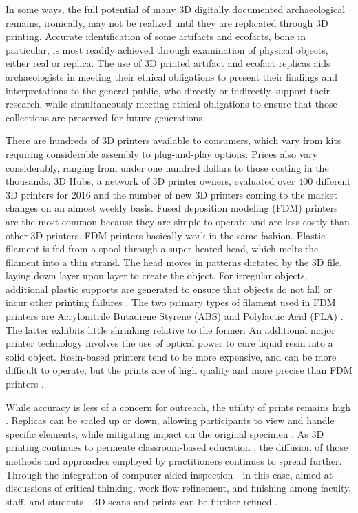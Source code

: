 \documentclass[review]{elsarticle}
\begin{document}
In some ways, the full potential of many 3D digitally documented archaeological remains, ironically, may not be realized until they are replicated through 3D printing. Accurate identification of some artifacts and ecofacts, bone in particular, is most readily achieved through examination of physical objects, either real or replica. The use of 3D printed artifact and ecofact replicas aids archaeologists in meeting their ethical obligations to present their findings and interpretations to the general public, who directly or indirectly support their research, while simultaneously meeting ethical obligations to ensure that those collections are preserved for future generations \citep{RN725}.

There are hundreds of 3D printers available to consumers, which vary from kits requiring considerable assembly to plug-and-play options. Prices also vary considerably, ranging from under one hundred dollars to those costing in the thousands. 3D Hubs, a network of 3D printer owners, evaluated over 400 different 3D printers for 2016 \citep{RN11513} and the number of new 3D printers coming to the market changes on an almost weekly basis. Fused deposition modeling (FDM) printers are the most common because they are simple to operate and are less costly than other 3D printers. FDM printers basically work in the same fashion. Plastic filament is fed from a spool through a super-heated head, which melts the filament into a thin strand. The head moves in patterns dictated by the 3D file, laying down layer upon layer to create the object. For irregular objects, additional plastic supports are generated to ensure that objects do not fall or incur other printing failures \citep{RN5946,RN5947}. The two primary types of filament used in FDM printers are Acrylonitrile Butadiene Styrene (ABS) and Polylactic Acid (PLA) \citep{RN11516,RN11515,RN11514}. The latter exhibits little shrinking relative to the former. An additional major printer technology involves the use of optical power to cure liquid resin into a solid object. Resin-based printers tend to be more expensive, and can be more difficult to operate, but the prints are of high quality and more precise than FDM printers \citep{RN11513}. 

While accuracy is less of a concern for outreach, the utility of prints remains high \citep{RN5938,RN5939}. Replicas can be scaled up or down, allowing participants to view and handle specific elements, while mitigating impact on the original specimen \citep{RN5922}. As 3D printing continues to permeate classroom-based education \citep{RN5933,RN5935,RN5936,RN5934,RN5937}, the diffusion of those methods and approaches employed by practitioners continues to spread further. Through the integration of computer aided inspection---in this case, aimed at discussions of critical thinking, work flow refinement, and finishing among faculty, staff, and students---3D scans and prints can be further refined \citep{RN5949,RN5951,RN5948,RN5950}.
\end{document}
